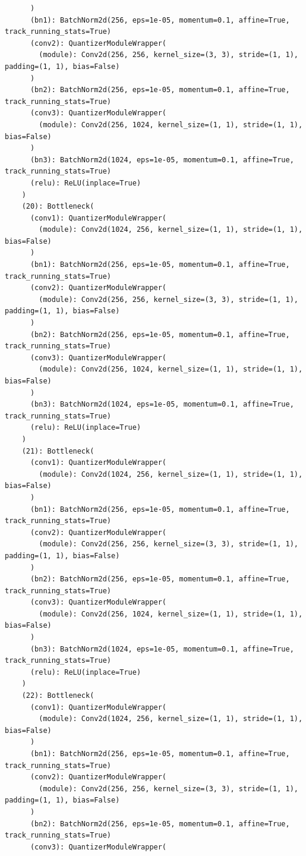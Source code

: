 \documentclass{article}
\begin{document}
\begin{verbatim}
      )
      (bn1): BatchNorm2d(256, eps=1e-05, momentum=0.1, affine=True, track_running_stats=True)
      (conv2): QuantizerModuleWrapper(
        (module): Conv2d(256, 256, kernel_size=(3, 3), stride=(1, 1), padding=(1, 1), bias=False)
      )
      (bn2): BatchNorm2d(256, eps=1e-05, momentum=0.1, affine=True, track_running_stats=True)
      (conv3): QuantizerModuleWrapper(
        (module): Conv2d(256, 1024, kernel_size=(1, 1), stride=(1, 1), bias=False)
      )
      (bn3): BatchNorm2d(1024, eps=1e-05, momentum=0.1, affine=True, track_running_stats=True)
      (relu): ReLU(inplace=True)
    )
    (20): Bottleneck(
      (conv1): QuantizerModuleWrapper(
        (module): Conv2d(1024, 256, kernel_size=(1, 1), stride=(1, 1), bias=False)
      )
      (bn1): BatchNorm2d(256, eps=1e-05, momentum=0.1, affine=True, track_running_stats=True)
      (conv2): QuantizerModuleWrapper(
        (module): Conv2d(256, 256, kernel_size=(3, 3), stride=(1, 1), padding=(1, 1), bias=False)
      )
      (bn2): BatchNorm2d(256, eps=1e-05, momentum=0.1, affine=True, track_running_stats=True)
      (conv3): QuantizerModuleWrapper(
        (module): Conv2d(256, 1024, kernel_size=(1, 1), stride=(1, 1), bias=False)
      )
      (bn3): BatchNorm2d(1024, eps=1e-05, momentum=0.1, affine=True, track_running_stats=True)
      (relu): ReLU(inplace=True)
    )
    (21): Bottleneck(
      (conv1): QuantizerModuleWrapper(
        (module): Conv2d(1024, 256, kernel_size=(1, 1), stride=(1, 1), bias=False)
      )
      (bn1): BatchNorm2d(256, eps=1e-05, momentum=0.1, affine=True, track_running_stats=True)
      (conv2): QuantizerModuleWrapper(
        (module): Conv2d(256, 256, kernel_size=(3, 3), stride=(1, 1), padding=(1, 1), bias=False)
      )
      (bn2): BatchNorm2d(256, eps=1e-05, momentum=0.1, affine=True, track_running_stats=True)
      (conv3): QuantizerModuleWrapper(
        (module): Conv2d(256, 1024, kernel_size=(1, 1), stride=(1, 1), bias=False)
      )
      (bn3): BatchNorm2d(1024, eps=1e-05, momentum=0.1, affine=True, track_running_stats=True)
      (relu): ReLU(inplace=True)
    )
    (22): Bottleneck(
      (conv1): QuantizerModuleWrapper(
        (module): Conv2d(1024, 256, kernel_size=(1, 1), stride=(1, 1), bias=False)
      )
      (bn1): BatchNorm2d(256, eps=1e-05, momentum=0.1, affine=True, track_running_stats=True)
      (conv2): QuantizerModuleWrapper(
        (module): Conv2d(256, 256, kernel_size=(3, 3), stride=(1, 1), padding=(1, 1), bias=False)
      )
      (bn2): BatchNorm2d(256, eps=1e-05, momentum=0.1, affine=True, track_running_stats=True)
      (conv3): QuantizerModuleWrapper(

\end{verbatim}
\end{document}
